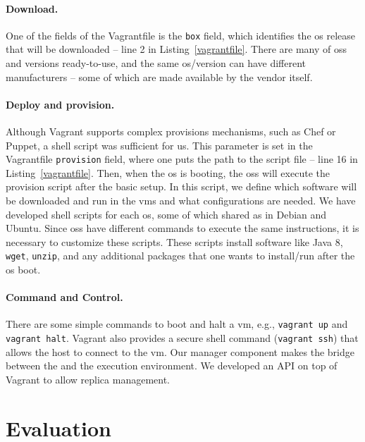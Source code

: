 \paragraph{Download.}
One of the fields of the Vagrantfile is the \texttt{box} field, which identifies the \gls{os} release that will be downloaded -- line 2 in Listing~\ref{vagrantfile}.
There are many of \glspl{os} and versions ready-to-use, and the same \gls{os}/version can have different manufacturers -- some of which are made available by the vendor itself.

\paragraph{Deploy and provision.}
Although Vagrant supports complex provisions mechanisms, such as Chef or Puppet, a shell script was sufficient for us. 
This parameter is set in the Vagrantfile \texttt{provision} field, where one puts the path to the script file -- line 16 in Listing~\ref{vagrantfile}.
Then, when the \gls{os} is booting, the \glspl{os} will execute the provision script after the basic setup.
In this script, we define which software will be downloaded and run in the \glspl{vm} and what configurations are needed. 
We have developed shell scripts for each \gls{os}, some of which shared as in Debian and Ubuntu. 
Since \glspl{os} have different commands to execute the same instructions, it is necessary to customize these scripts.
These scripts install software like Java 8, \texttt{wget}, \texttt{unzip}, and any additional packages that one wants to install/run after the \gls{os} boot.



\paragraph{Command and Control.}
There are some simple commands to boot and halt a \gls{vm}, e.g., \texttt{vagrant up} and \texttt{vagrant halt}. 
Vagrant also provides a secure shell command (\texttt{vagrant ssh}) that allows the host to connect to the \gls{vm}. 
Our manager component makes the bridge between the \risk and the execution environment.
We developed an API on top of Vagrant to allow replica management.



\section{Evaluation}
\label{sec:overhead}

